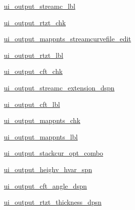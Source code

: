 \begin{DoxyCompactItemize}
\hyperlink{classbladepro__modules_1_1inputfile__writer_u_i_1_1_ui___main_window_a1436e56fad76cd38cf1f87db08b539b8}{ui\+\_\+output\+\_\+streamc\+\_\+lbl}
\item 
\hyperlink{classbladepro__modules_1_1inputfile__writer_u_i_1_1_ui___main_window_a336846c91ac57b8ab8ab0f2b5c5a0b9e}{ui\+\_\+output\+\_\+rtzt\+\_\+chk}
\item 
\hyperlink{classbladepro__modules_1_1inputfile__writer_u_i_1_1_ui___main_window_a806b947963fcab17402d6c5b4cc16368}{ui\+\_\+output\+\_\+mappnts\+\_\+streamcurvefile\+\_\+edit}
\item 
\hyperlink{classbladepro__modules_1_1inputfile__writer_u_i_1_1_ui___main_window_a17ad2111dee7da23381837dc87ce9a6c}{ui\+\_\+output\+\_\+rtzt\+\_\+lbl}
\item 
\hyperlink{classbladepro__modules_1_1inputfile__writer_u_i_1_1_ui___main_window_a1b032189cdd7d3d01263d73bfd778d92}{ui\+\_\+output\+\_\+cft\+\_\+chk}
\item 
\hyperlink{classbladepro__modules_1_1inputfile__writer_u_i_1_1_ui___main_window_ae4dbdbe6b6da83089c1ae51bb6cdb1e2}{ui\+\_\+output\+\_\+streamc\+\_\+extension\+\_\+dspn}
\item 
\hyperlink{classbladepro__modules_1_1inputfile__writer_u_i_1_1_ui___main_window_ac2158a8a751f8d5478c20a551799d3b1}{ui\+\_\+output\+\_\+cft\+\_\+lbl}
\item 
\hyperlink{classbladepro__modules_1_1inputfile__writer_u_i_1_1_ui___main_window_afcb54ff967d6a7fc001c9714f038ab80}{ui\+\_\+output\+\_\+mappnts\+\_\+chk}
\item 
\hyperlink{classbladepro__modules_1_1inputfile__writer_u_i_1_1_ui___main_window_a96c4756f82fdfe6fa5385898c3d96a91}{ui\+\_\+output\+\_\+mappnts\+\_\+lbl}
\item 
\hyperlink{classbladepro__modules_1_1inputfile__writer_u_i_1_1_ui___main_window_a9a81933c3dedf38f28446661eb6796fa}{ui\+\_\+output\+\_\+stackcur\+\_\+opt\+\_\+combo}
\item 
\hyperlink{classbladepro__modules_1_1inputfile__writer_u_i_1_1_ui___main_window_af92fe733419818e322c45b716966440b}{ui\+\_\+output\+\_\+heighv\+\_\+hvar\+\_\+spn}
\item 
\hyperlink{classbladepro__modules_1_1inputfile__writer_u_i_1_1_ui___main_window_aa8751b98f2848d66d991f668a8061b50}{ui\+\_\+output\+\_\+cft\+\_\+angle\+\_\+dspn}
\item 
\hyperlink{classbladepro__modules_1_1inputfile__writer_u_i_1_1_ui___main_window_a0ce457bc120667aadadd3ade828c65b3}{ui\+\_\+output\+\_\+rtzt\+\_\+thickness\+\_\+dpsn}

\end{DoxyCompactItemize}

